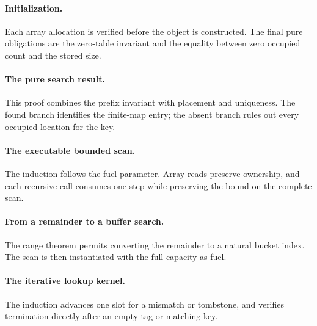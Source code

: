 \documentclass[11pt]{article}
\begin{document}
\paragraph{Initialization.} Each array allocation is verified before the object is constructed. The final pure obligations are the zero-table invariant and the equality between zero occupied count and the stored size.



\paragraph{The pure search result.} This proof combines the prefix invariant with placement and uniqueness. The found branch identifies the finite-map entry; the absent branch rules out every occupied location for the key.



\paragraph{The executable bounded scan.} The induction follows the fuel parameter. Array reads preserve ownership, and each recursive call consumes one step while preserving the bound on the complete scan.



\paragraph{From a remainder to a buffer search.} The range theorem permits converting the remainder to a natural bucket index. The scan is then instantiated with the full capacity as fuel.



\paragraph{The iterative lookup kernel.} The induction advances one slot for a mismatch or tombstone, and verifies termination directly after an empty tag or matching key.


\end{document}
